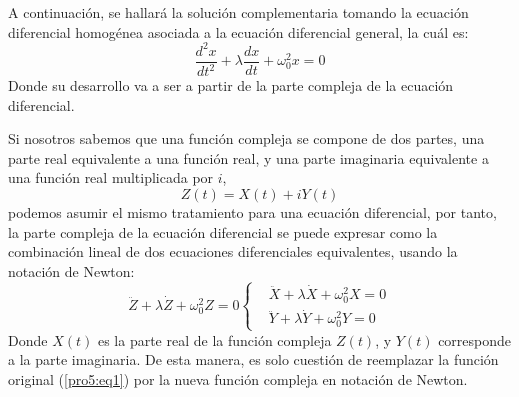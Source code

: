 \begin{multicols}{2}
A continuación, se hallará la solución complementaria tomando la ecuación diferencial homogénea asociada a la ecuación diferencial general, la cuál es:
\begin{equation}
    \frac{d^{2}x}{dt^{2}} + \lambda \frac{dx}{dt} + \omega_{0}^{2}x = 0 \label{pro5:eq1}
\end{equation}
Donde su desarrollo va a ser a partir de la parte compleja de la ecuación diferencial.

Si nosotros sabemos que una función compleja se compone de dos partes, una parte real equivalente a una función real, y una parte imaginaria equivalente a una función real multiplicada por $i$,
\begin{equation*}
    Z(t) = X(t) + i Y(t)
\end{equation*}
podemos asumir el mismo tratamiento para una ecuación diferencial, por tanto, la parte compleja de la ecuación diferencial se puede expresar como la combinación lineal de dos ecuaciones diferenciales equivalentes, usando la notación de Newton:
\begin{equation*}
\ddot{Z} + \lambda \dot{Z} + \omega_{0}^{2}Z = 0
    \begin{cases}
        &\ddot{X} + \lambda \dot{X} + \omega_{0}^{2}X = 0\\
        &\ddot{Y} + \lambda \dot{Y} + \omega_{0}^{2}Y = 0
    \end{cases}
\end{equation*}
Donde $X(t)$ es la parte real de la función compleja $Z(t)$, y $Y(t)$ corresponde a la parte imaginaria. De esta manera, es solo cuestión de reemplazar la función original (\ref{pro5:eq1}) por la nueva función compleja en notación de Newton.


\end{multicols}
